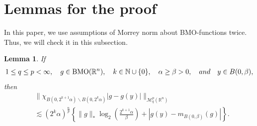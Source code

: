 \documentclass[11pt,a4]{article}
\numberwithin{equation}{section}
\newtheorem{lemma}[theorem]{Lemma}
\theoremstyle{definition}
\theoremstyle{remark}
\begin{document}
\section{Lemmas for the proof}
In this paper, we use assumptions of Morrey norm about BMO-functions twice. Thus, we will check it in this subsection.
\begin{lemma}\label{BMO dyadic}
	If
	\begin{align*}
		1 \le q \le p < \infty, \quad g \in {\rm BMO}({\mathbb R}^n), \quad k \in \mathbb N \cup \{0\}, \quad \alpha \ge \beta > 0, \quad and \quad y \in B(0,\beta),
	\end{align*}
	then
	\begin{align*}
		&\| \chi_{B(0,2^{k+1}\alpha) \backslash B(0,2^k\alpha)} |g-g(y)| \|_{{\mathcal M}{}^p_q({\mathbb R}^n)}\\
		&\lesssim (2^{k}\alpha)^{\frac{n}{p}} \left\{ \|g\|_* \log_2\left(\frac{2^{k+1}\alpha}{\beta}\right) + |g(y)-m_{B(0,\beta)}(g)| \right\}.
	\end{align*}
\end{lemma}
\end{document}
